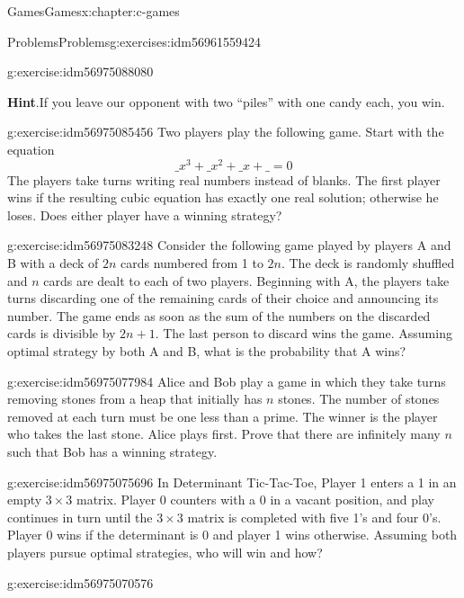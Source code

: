 \documentclass[twoside,10pt,]{book}
\newcommand{\blocktitlefont}{\relax}
\numberwithin{equation}{section}
\begin{document}
\begin{chapterptx}{Games}{}{Games}{}{}{x:chapter:c-games}
\begin{exercises-section}{Problems}{}{Problems}{}{}{g:exercises:idm56961559424}
\begin{divisionexercise}{3}{}{}{g:exercise:idm56975088080}
\par\smallskip%
\noindent\textbf{\blocktitlefont Hint}.\hypertarget{g:hint:idm56975086224}{}\quad{}If you leave our opponent with two ``piles'' with one candy each, you win.%
\end{divisionexercise}%
\begin{divisionexercise}{4}{}{}{g:exercise:idm56975085456}%
Two players play the following game. Start with the equation%
\begin{equation*}
\_ x^3 + \_ x^2 + \_ x + \_= 0
\end{equation*}
The players take turns writing real numbers instead of blanks. The first player wins if the resulting cubic equation has exactly one real solution; otherwise he loses. Does either player have a winning strategy?%
\end{divisionexercise}%
\begin{divisionexercise}{5}{}{}{g:exercise:idm56975083248}%
Consider the following game played by players A and B with a deck of \(2n\) cards numbered from 1 to \(2n\). The deck is randomly shuffled and \(n\) cards are dealt to each of two players. Beginning with A, the players take turns discarding one of the remaining cards of their choice and announcing its number. The game ends as soon as the sum of the numbers on the discarded cards is divisible by \(2n + 1\). The last person to discard wins the game. Assuming optimal strategy by both A and B, what is the probability that A wins?%
\end{divisionexercise}%
\begin{divisionexercise}{6}{}{}{g:exercise:idm56975077984}%
Alice and Bob play a game in which they take turns removing stones from a heap that initially has \(n\) stones. The number of stones removed at each turn must be one less than a prime. The winner is the player who takes the last stone. Alice plays first. Prove that there are infinitely many \(n\) such that Bob has a winning strategy.%
\end{divisionexercise}%
\begin{divisionexercise}{7}{}{}{g:exercise:idm56975075696}%
In  Determinant Tic-Tac-Toe, Player 1 enters a 1 in an empty \(3\times 3\) matrix. Player 0 counters with a 0 in a vacant position, and play continues in turn until the \(3 \times  3\) matrix is completed with five 1's and four 0's. Player 0 wins if the determinant is 0 and player 1 wins otherwise. Assuming both players pursue optimal strategies, who will win and how?%
\end{divisionexercise}%
\begin{divisionexercise}{8}{}{}{g:exercise:idm56975070576}%

\end{divisionexercise}
\end{exercises-section}
\end{chapterptx}
\end{document}

